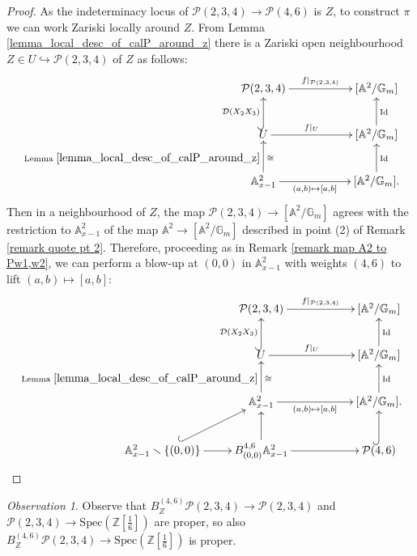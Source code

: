 \documentclass[11pt]{amsart}
\theoremstyle{definition}
\theoremstyle{remark}
\newtheorem{observation}{Observation}
\newcommand{\bA}{{\mathbb A}}
\newcommand{\calP}{\mathcal P}
\newcommand{\calD}{\mathcal D}
\newcommand{\bG}{\mathbb{G}}
\newcommand{\Spec}{\mathrm{Spec}}
\begin{document}
\begin{proof}As the indeterminacy locus of $\calP(2,3,4)\to \calP(4,6)$ is $Z$, to construct $\pi$ we can work Zariski locally around $Z$. From Lemma \ref{lemma_local_desc_of_calP_around_z} there is a Zariski open neighbourhood $Z\in U\hookrightarrow \calP(2,3,4)$ of $Z$ as follows: \begin{equation}\label{diagram for lifting}
    \xymatrix{\calP(2,3,4)\ar[rr]^-{f|_{\calP(2,3,4)}} && [\bA^2/\bG_m] \\ U \ar@{^{(}->}[u]^{\calD(X_2X_3)} \ar[rr]^-{f|_U} && [\bA^2/\bG_m]\ar[u]_{\operatorname{Id}} \\ \bA^2_{x-1}\ar[u]^{\text{ Lemma } \ref{lemma_local_desc_of_calP_around_z}}_\cong\ar[rr]_-{(a,b)\mapsto [a,b]} && [\bA^2/\bG_m]. \ar[u]_{\operatorname{Id}}} 
\end{equation} Then in a neighbourhood of $Z$, the map $\calP(2,3,4)\to [\bA^2/\bG_m]$ agrees with the restriction to $\bA^2_{x-1}$ of the map $\bA^2\to [\bA^2/\bG_m]$ described in point (2) of Remark \ref{remark quote pt 2}. 
Therefore, proceeding as in Remark \ref{remark map A2 to Pw1,w2}, we can perform a blow-up at $(0,0)$ in $\bA^2_{x-1}$ with weights $(4,6)$ to lift $(a,b)\mapsto [a,b]$:
\begin{equation}
    \xymatrix{&\calP(2,3,4)\ar[rr]^-{f|_{\calP(2,3,4)}} && [\bA^2/\bG_m] \\& U \ar@{^{(}->}[u]^{\calD(X_2X_3)} \ar[rr]^-{f|_U} && [\bA^2/\bG_m]\ar[u]_{\operatorname{Id}} \\ &\bA^2_{x-1}\ar[u]^{\text{ Lemma } \ref{lemma_local_desc_of_calP_around_z}}_\cong\ar[rr]_-{(a,b)\mapsto [a,b]} && [\bA^2/\bG_m]. \ar[u]_{\operatorname{Id}}\\\bA^2_{x-1}\smallsetminus \{(0,0)\}\ar[r]\ar@{^{(}->}[ur]&
    B_{(0,0)}^{4, 6}\bA^2_{x-1} \ar[u]\ar[rr] && \calP(4,6)\ar@{^{(}->}[u]} 
\end{equation}
\end{proof}

\begin{observation}
Observe that $B_Z^{(4,6)}\calP(2,3,4)\to \calP(2,3,4)$ and $\calP(2,3,4)\to \Spec(\mathbb{Z}[\frac{1}{6}])$ are proper, so also $B_Z^{(4,6)}\calP(2,3,4)\to \Spec(\mathbb{Z}[\frac{1}{6}])$ is proper.
\end{observation}
 
\end{document}
